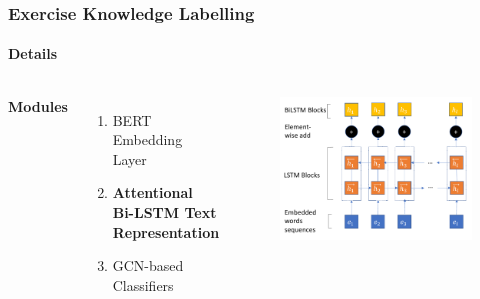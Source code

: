 \documentclass{beamer}
\begin{document}
\begin{frame}
  \frametitle{Exercise Knowledge Labelling}
  \framesubtitle{Details}
  \begin{columns}[c] %
    \textbf{Modules}
    \begin{enumerate}
      \item BERT~\cite{devlin2019bert} Embedding Layer
      \item \textbf{Attentional Bi-LSTM Text Representation}
      \item GCN-based Classifiers
    \end{enumerate}
    \begin{figure}
      \includegraphics[width=1.0\textwidth]{figures/ch2-model-bilstm.pdf}
    \end{figure}
  \end{columns}
\end{frame}
\end{document}

